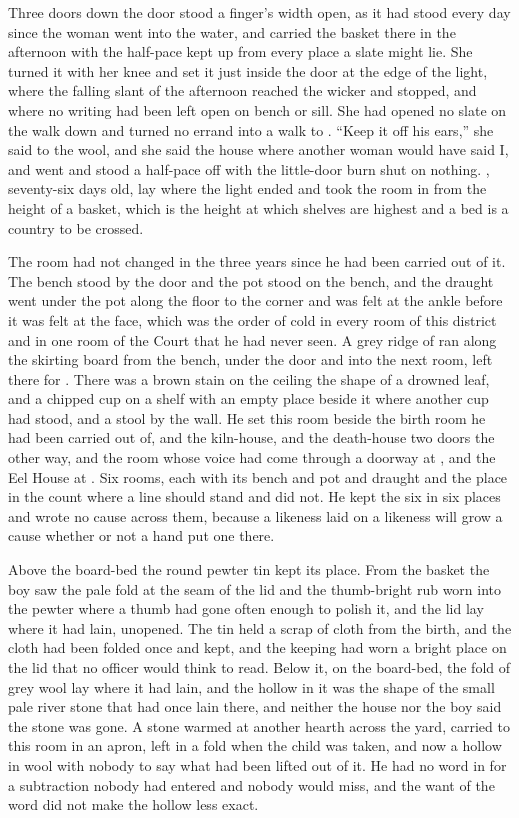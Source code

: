Three doors down  the door stood a finger's width open, as it had stood every day since the woman went into the water, and  carried the basket there in the afternoon with the half-pace kept up from every place a slate might lie. She turned it with her knee and set it just inside the door at the edge of the light, where the falling slant of the afternoon reached the wicker and stopped, and where no writing had been left open on bench or sill. She had opened no slate on the walk down and turned no errand into a walk to . “Keep it off his ears,” she said to the wool, and she said the house where another woman would have said I, and went and stood a half-pace off with the little-door burn shut on nothing. , seventy-six days old, lay where the light ended and took the room in from the height of a basket, which is the height at which shelves are highest and a bed is a country to be crossed.

The room had not changed in the three years since he had been carried out of it. The bench stood by the door and the pot stood on the bench, and the draught went under the pot along the floor to the corner and was felt at the ankle before it was felt at the face, which was the order of cold in every room of this district and in one room of the Court that he had never seen. A grey ridge of  ran along the skirting board from the bench, under the door and into the next room, left there for . There was a brown stain on the ceiling the shape of a drowned leaf, and a chipped cup on a shelf with an empty place beside it where another cup had stood, and a stool by the wall. He set this room beside the birth room he had been carried out of, and the kiln-house, and the death-house two doors the other way, and the room whose voice had come through a doorway at , and the Eel House at . Six rooms, each with its bench and pot and draught and the place in the count where a line should stand and did not. He kept the six in six places and wrote no cause across them, because a likeness laid on a likeness will grow a cause whether or not a hand put one there.

Above the board-bed the round pewter tin kept its place. From the basket the boy saw the pale fold at the seam of the lid and the thumb-bright rub worn into the pewter where a thumb had gone often enough to polish it, and the lid lay where it had lain, unopened. The tin held a scrap of cloth from the birth, and the cloth had been folded once and kept, and the keeping had worn a bright place on the lid that no officer would think to read. Below it, on the board-bed, the fold of grey wool lay where it had lain, and the hollow in it was the shape of the small pale river stone that had once lain there, and neither the house nor the boy said the stone was gone. A stone warmed at another hearth across the yard, carried to this room in an apron, left in a fold when the child was taken, and now a hollow in wool with nobody to say what had been lifted out of it. He had no word in  for a subtraction nobody had entered and nobody would miss, and the want of the word did not make the hollow less exact.


